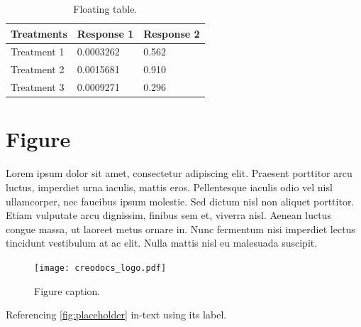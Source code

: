 \documentclass[
	11pt,
	fleqn,
	a4paper,
]{LegrandOrangeBook}
\begin{document}
\begin{table}[t] %
	\centering %
	\begin{tabular}{L{0.15\textwidth} R{0.15\textwidth} R{0.15\textwidth}} %
		\toprule
		\textbf{Treatments} & \textbf{Response 1} & \textbf{Response 2} \\
		\midrule
		Treatment 1         & 0.0003262           & 0.562               \\
		Treatment 2         & 0.0015681           & 0.910               \\
		Treatment 3         & 0.0009271           & 0.296               \\
		\bottomrule
	\end{tabular}
	\caption{Floating table.}
	\label{tab:floating} %
\end{table}


\section{Figure}

Lorem ipsum dolor sit amet, consectetur adipiscing elit. Praesent porttitor arcu luctus, imperdiet urna iaculis, mattis eros. Pellentesque iaculis odio vel nisl ullamcorper, nec faucibus ipsum molestie. Sed dictum nisl non aliquet porttitor. Etiam vulputate arcu dignissim, finibus sem et, viverra nisl. Aenean luctus congue massa, ut laoreet metus ornare in. Nunc fermentum nisi imperdiet lectus tincidunt vestibulum at ac elit. Nulla mattis nisl eu malesuada suscipit.

\begin{figure}[H] %
	\centering %
	\texttt{[image: creodocs\_logo.pdf]} %
	\caption{Figure caption.}
	\label{fig:placeholder} %
\end{figure}

Referencing \autoref{fig:placeholder} in-text using its label.
\end{document}

